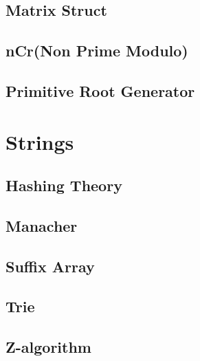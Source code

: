 \subsection{Matrix Struct}
\raggedbottom
\subsection{nCr(Non Prime Modulo)}
\raggedbottom
\subsection{Primitive Root Generator}
\raggedbottom

\section{Strings}
\subsection{Hashing Theory}
\raggedbottom
\subsection{Manacher}
\raggedbottom
\subsection{Suffix Array}
\raggedbottom
\subsection{Trie}
\raggedbottom
\subsection{Z-algorithm}
\raggedbottom